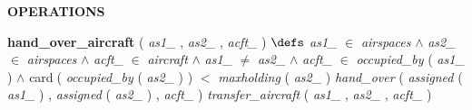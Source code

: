 \begin{tabbing}
\bSetTabs
\+\> \-
%
%
\bnl\bnl
{\bf OPERATIONS} \+ \bbnl

%
%
{\bf { hand\_over\_aircraft}} ( {\em as1\_\/} , {\em as2\_\/} , {\em acft\_\/} ) \bhsp $\defs$ \+ \bnl
  \+\bnl
{\em as1\_\/} $\in$ {\em airspaces\/}\label{airspaces}  $\wedge$
{\em as2\_\/} $\in$ {\em airspaces\/}\label{airspaces}  $\wedge$ \bnl
{\em acft\_\/} $\in$ {\em aircraft\/}\label{aircraft}  $\wedge$ \bnl
{\em as1\_\/} $\neq$ {\em as2\_\/} $\wedge$ \bnl
{\em acft\_\/} $\in$ {\em occupied\_by\/}\label{occupied_by}  ( {\em as1\_\/} )  $\wedge$ \bnl
{\sf card}$\;$( {\em occupied\_by\/}\label{occupied_by}  ( {\em as2\_\/} )  )  $<$ {\em maxholding\/}\label{maxholding}  ( {\em as2\_\/} )  \-\bnl
{} \+\bnl
{\em hand\_over\/}\label{hand_over}  ( {\em assigned\/}\label{assigned}  ( {\em as1\_\/} )  , {\em assigned\/}\label{assigned}  ( {\em as2\_\/} )  , {\em acft\_\/} )  \bparallel \bnl
{\em transfer\_aircraft\/}\label{transfer_aircraft}  ( {\em as1\_\/} , {\em as2\_\/} , {\em acft\_\/} )  \-\bnl
{}  \- \bOperationSemiColon 
\end{tabbing}
\bresetindent
%
%
\vspace{-4.5ex}\bsetindent
